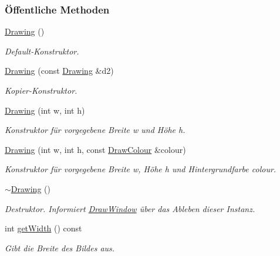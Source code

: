 \subsubsection*{Öffentliche Methoden}
\begin{DoxyCompactItemize}
\item 
\mbox{\hyperlink{classDrawing_a9fb3a5b171cda26bb4dfccce875642c3}{Drawing}} ()
\begin{DoxyCompactList}\small\item\em Default-\/\+Konstruktor. \end{DoxyCompactList}\item 
\mbox{\hyperlink{classDrawing_a17c39c9f29437c7f30fb22a1b007833d}{Drawing}} (const \mbox{\hyperlink{classDrawing}{Drawing}} \&d2)
\begin{DoxyCompactList}\small\item\em Kopier-\/\+Konstruktor. \end{DoxyCompactList}\item 
\mbox{\hyperlink{classDrawing_a15cdefe87db87a22c59e61e64c849cfd}{Drawing}} (int w, int h)
\begin{DoxyCompactList}\small\item\em Konstruktor für vorgegebene Breite {\ttfamily w} und Höhe {\ttfamily h}. \end{DoxyCompactList}\item 
\mbox{\hyperlink{classDrawing_a3bbc5afdee11ef4fb66bfa1a8b4d0e22}{Drawing}} (int w, int h, const \mbox{\hyperlink{classDrawColour}{Draw\+Colour}} \&colour)
\begin{DoxyCompactList}\small\item\em Konstruktor für vorgegebene Breite {\ttfamily w}, Höhe {\ttfamily h} und Hintergrundfarbe {\ttfamily colour}. \end{DoxyCompactList}\item 
\mbox{\hyperlink{classDrawing_a704a4be87976fca2f8b175a4aa257e9d}{$\sim$\+Drawing}} ()
\begin{DoxyCompactList}\small\item\em Destruktor. Informiert \mbox{\hyperlink{classDrawWindow}{Draw\+Window}} über das Ableben dieser Instanz. \end{DoxyCompactList}\item 
int \mbox{\hyperlink{classDrawing_ad1272e2a9ec8cd0f69f5c42f9c95c6ce}{get\+Width}} () const
\begin{DoxyCompactList}\small\item\em Gibt die Breite des Bildes aus. \end{DoxyCompactList}\item 

\end{DoxyCompactItemize}
